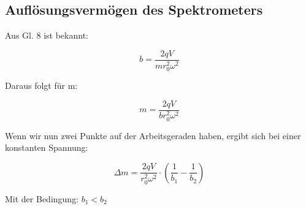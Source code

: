 \newpage
\subsection{Auflösungsvermögen des Spektrometers}
Aus Gl. 8 ist bekannt:

\begin{equation}
b = \frac{2qV}{mr_{0}^{2}\omega^{2}}
\end{equation}

Daraus folgt für m:

\begin{equation}
m = \frac{2qV}{br_{0}^{2}\omega^{2}}
\end{equation}

Wenn wir nun zwei Punkte auf der Arbeitsgeraden haben, ergibt sich bei einer konstanten Spannung:

\begin{equation}
\Delta m = \frac{2qV}{r_{0}^{2}\omega^{2}}\cdot \left( \frac{1}{b_1}-\frac{1}{b_2}\right)
\end{equation}

Mit der Bedingung: $b_1 < b_2$